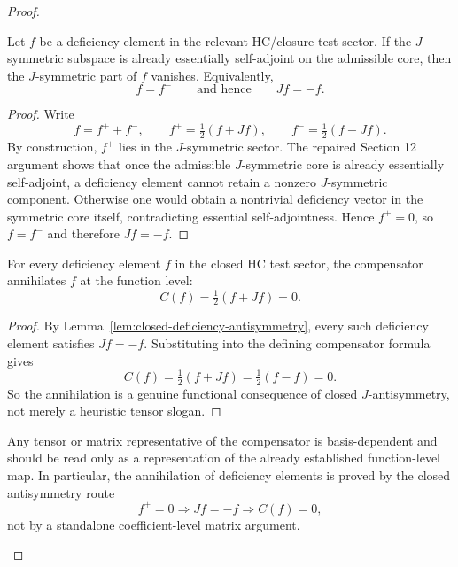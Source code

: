 \begin{proof}

\begin{lemma}
\label{lem:closed-deficiency-antisymmetry}
Let $f$ be a deficiency element in the relevant HC/closure test sector. If the
$J$-symmetric subspace is already essentially self-adjoint on the admissible
core, then the $J$-symmetric part of $f$ vanishes. Equivalently,
\[
  f=f^-\qquad\text{and hence}\qquad Jf=-f.
\]
\end{lemma}

\begin{proof}
Write
\[
  f=f^+ + f^-,\qquad f^+=\tfrac12(f+Jf),\qquad f^- = \tfrac12(f-Jf).
\]
By construction, $f^+$ lies in the $J$-symmetric sector. The repaired Section 12
argument shows that once the admissible $J$-symmetric core is already
essentially self-adjoint, a deficiency element cannot retain a nonzero
$J$-symmetric component. Otherwise one would obtain a nontrivial deficiency
vector in the symmetric core itself, contradicting essential self-adjointness.
Hence $f^+=0$, so $f=f^-$ and therefore $Jf=-f$.
\end{proof}

\begin{proposition}
\label{prop:functional-hc-annihilation}
For every deficiency element $f$ in the closed HC test sector, the compensator
annihilates $f$ at the function level:
\[
  C(f)=\tfrac12(f+Jf)=0.
\]
\end{proposition}

\begin{proof}
By Lemma~\ref{lem:closed-deficiency-antisymmetry}, every such deficiency element
satisfies $Jf=-f$. Substituting into the defining compensator formula gives
\[
  C(f)=\tfrac12(f+Jf)=\tfrac12(f-f)=0.
\]
So the annihilation is a genuine functional consequence of closed
$J$-antisymmetry, not merely a heuristic tensor slogan.
\end{proof}

\begin{remark}
\label{rem:tensor-secondary-functional-proof}
Any tensor or matrix representative of the compensator is basis-dependent and
should be read only as a representation of the already established function-level
map. In particular, the annihilation of deficiency elements is proved by the
closed antisymmetry route
\[
  f^+=0 \Longrightarrow Jf=-f \Longrightarrow C(f)=0,
\]
not by a standalone coefficient-level matrix argument.
\end{remark}


\end{proof}
